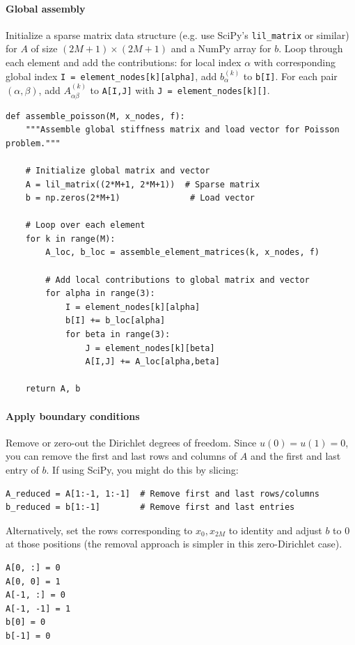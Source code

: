 \documentclass[a4paper,10pt]{article}
\begin{document}
\paragraph{Global assembly}
Initialize a sparse matrix data structure (e.g. use SciPy's \texttt{lil_matrix} or similar) for \(A\) of size \((2M+1)\times(2M+1)\) and a NumPy array for \(b\).
Loop through each element and add the contributions: for local index \(\alpha\) with corresponding global index \texttt{I = element_nodes[k][alpha]}, add \(b^{(k)}_\alpha\) to \texttt{b[I]}.
For each pair \((\alpha,\beta)\), add \(A^{(k)}_{\alpha\beta}\) to \texttt{A[I,J]} with \texttt{J = element_nodes[k][\beta]}.
\begin{verbatim}
def assemble_poisson(M, x_nodes, f):
	"""Assemble global stiffness matrix and load vector for Poisson problem."""
	
	# Initialize global matrix and vector
	A = lil_matrix((2*M+1, 2*M+1))  # Sparse matrix
	b = np.zeros(2*M+1)              # Load vector
	
	# Loop over each element
	for k in range(M):
		A_loc, b_loc = assemble_element_matrices(k, x_nodes, f)
		
		# Add local contributions to global matrix and vector
		for alpha in range(3):
			I = element_nodes[k][alpha]
			b[I] += b_loc[alpha]
			for beta in range(3):
				J = element_nodes[k][beta]
				A[I,J] += A_loc[alpha,beta]
	
	return A, b
\end{verbatim}


\paragraph{Apply boundary conditions}
Remove or zero-out the Dirichlet degrees of freedom.
Since \(u(0)=u(1)=0\), you can remove the first and last rows and columns of \(A\) and the first and last entry of \(b\).
If using SciPy, you might do this by slicing:
\begin{verbatim}
A_reduced = A[1:-1, 1:-1]  # Remove first and last rows/columns
b_reduced = b[1:-1]        # Remove first and last entries
\end{verbatim}
Alternatively, set the rows corresponding to \(x_0,x_{2M}\) to identity and adjust \(b\) to 0 at those positions (the removal approach is simpler in this zero-Dirichlet case).
\begin{verbatim}
A[0, :] = 0
A[0, 0] = 1
A[-1, :] = 0
A[-1, -1] = 1
b[0] = 0
b[-1] = 0
\end{verbatim}
\end{document}
